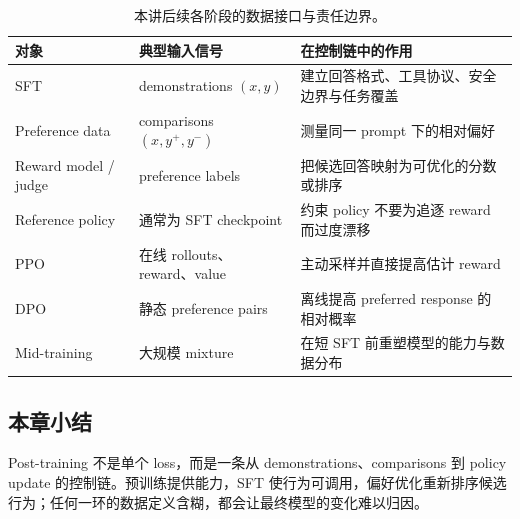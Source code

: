 \begin{table}[H]
\centering
\begin{tabular}{L{0.17\textwidth}L{0.27\textwidth}L{0.46\textwidth}}
\toprule
对象 & 典型输入信号 & 在控制链中的作用 \\
\midrule
SFT & demonstrations $(x,y)$ & 建立回答格式、工具协议、安全边界与任务覆盖 \\
Preference data & comparisons $(x,y^+,y^-)$ & 测量同一 prompt 下的相对偏好 \\
Reward model / judge & preference labels & 把候选回答映射为可优化的分数或排序 \\
Reference policy & 通常为 SFT checkpoint & 约束 policy 不要为追逐 reward 而过度漂移 \\
PPO & 在线 rollouts、reward、value & 主动采样并直接提高估计 reward \\
DPO & 静态 preference pairs & 离线提高 preferred response 的相对概率 \\
Mid-training & 大规模 mixture & 在短 SFT 前重塑模型的能力与数据分布 \\
\bottomrule
\end{tabular}
\caption{本讲后续各阶段的数据接口与责任边界。}
\end{table}

\subsection{本章小结}

Post-training 不是单个 loss，而是一条从 demonstrations、comparisons 到 policy update 的控制链。预训练提供能力，SFT 使行为可调用，偏好优化重新排序候选行为；任何一环的数据定义含糊，都会让最终模型的变化难以归因。

